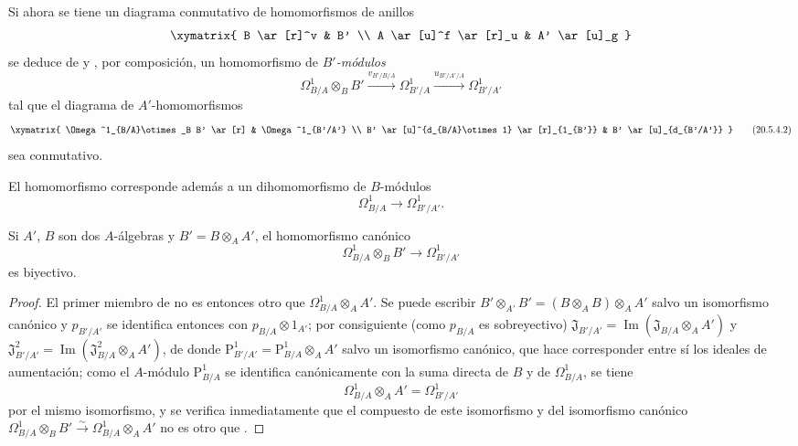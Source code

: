 \begin{env}[20.5.4]
\label{0.20.5.4-fr}
Si ahora se tiene un diagrama conmutativo de homomorfismos de anillos
\[
\xymatrix{
  B \ar[r]^v & B' \\
  A \ar[u]^f \ar[r]_u & A' \ar[u]_g
}
\]
se deduce de  y , por composición,
un homomorfismo de \emph{$B'$-módulos}
\begin{equation}
\tag{20.5.4.1}
\label{0.20.5.4.1-fr}
  \Omega^1_{B/A}\otimes_B B'
  \xrightarrow{v_{B'/B/A}}\Omega^1_{B'/A}
  \xrightarrow{u_{B'/A'/A}}\Omega^1_{B'/A'}
\end{equation}
tal que el diagrama de $A'$-homomorfismos
\[
\xymatrix{
  \Omega^1_{B/A}\otimes_B B' \ar[r] & \Omega^1_{B'/A'} \\
  B' \ar[u]^{d_{B/A}\otimes1} \ar[r]_{1_{B'}} &
  B' \ar[u]_{d_{B'/A'}}
}
\tag{20.5.4.2}
\label{0.20.5.4.2-fr}
\]
sea conmutativo.

El homomorfismo  corresponde además a un
dihomomorfismo de $B$-módulos
\begin{equation}
\tag{20.5.4.3}
\label{0.20.5.4.3-fr}
  \Omega^1_{B/A}\to\Omega^1_{B'/A'}.
\end{equation}
\end{env}

\begin{proposition}[20.5.5]
\label{0.20.5.5-fr}
Si $A'$, $B$ son dos $A$-álgebras y $B'=B\otimes_A A'$,
el homomorfismo canónico \textup{}
\begin{equation}
\tag{20.5.5.1}
\label{0.20.5.5.1-fr}
  \Omega^1_{B/A}\otimes_B B'\to\Omega^1_{B'/A'}
\end{equation}
es biyectivo.
\end{proposition}

\begin{proof}
El primer miembro de  no es entonces otro que
$\Omega^1_{B/A}\otimes_A A'$. Se puede escribir
$B'\otimes_{A'}B'=(B\otimes_A B)\otimes_A A'$ salvo un isomorfismo canónico
y $p_{B'/A'}$ se identifica entonces con
$p_{B/A}\otimes1_{A'}$; por consiguiente (como $p_{B/A}$ es sobreyectivo)
$\mathfrak{J}_{B'/A'}=\operatorname{Im}(\mathfrak{J}_{B/A}\otimes_A A')$
y
$\mathfrak{J}^2_{B'/A'}
=\operatorname{Im}(\mathfrak{J}^2_{B/A}\otimes_A A')$, de donde
$\mathrm{P}^1_{B'/A'}=\mathrm{P}^1_{B/A}\otimes_A A'$ salvo un isomorfismo
canónico, que hace corresponder entre sí los ideales de aumentación;
como el $A$-módulo $\mathrm{P}^1_{B/A}$ se identifica canónicamente con la
suma directa de $B$ y de $\Omega^1_{B/A}$, se tiene
\begin{equation}
\tag{20.5.5.2}
\label{0.20.5.5.2-fr}
  \Omega^1_{B/A}\otimes_A A'=\Omega^1_{B'/A'}
\end{equation}
por el mismo isomorfismo, y se verifica inmediatamente que el compuesto de este
isomorfismo y del isomorfismo canónico
$\Omega^1_{B/A}\otimes_B B'\xrightarrow{\sim}
\Omega^1_{B/A}\otimes_A A'$ no es otro que .
\end{proof}

